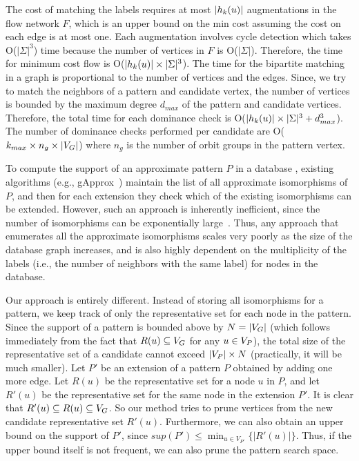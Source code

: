 \medskip{} The cost of matching the
\khop labels requires at most $|h_{k}(u)|$ augmentations in the flow
network $F$, which is an upper bound on the min cost assuming the cost on
each edge is at most one. Each augmentation involves cycle detection
which takes O($|\Sigma|^3$) time because the number of vertices in $F$ is
O($|\Sigma|$).  Therefore, the time for minimum cost flow is 
O($|h_{k}(u) | \times |\Sigma|^3 $).
The time for the bipartite matching in a graph is
proportional to the number of vertices and the edges.  Since, we
try to match the neighbors of a pattern and candidate vertex,  the number
of vertices is bounded by the maximum degree $d_{max}$ of the pattern
and candidate vertices. Therefore, the total time for each dominance
check is O($|h_{k}(u)| \times |\Sigma|^3 + d_{max}^{3}$).  The
number of dominance checks performed per candidate are O($k_{max}
\times n_g \times |V_G|$) where $n_g$ is the number of orbit groups in
the pattern vertex. 

To compute the support of an approximate pattern $P$ in a database \db,
existing algorithms (e.g., gApprox~\cite{gapprox}) maintain the list of
all approximate isomorphisms of $P$, and then for each extension they
check which of the existing isomorphisms can be extended. However, such an
approach is inherently inefficient, since the number of isomorphisms can
be exponentially large~\cite{2012-kais}.  Thus, any approach that
enumerates all the approximate isomorphisms scales very poorly as the size
of the database graph increases, and is also highly dependent on the
multiplicity of the labels (i.e., the number of neighbors with the same
label) for nodes in the database.

Our approach is entirely different. Instead of storing all isomorphisms
for a pattern, we keep track of only the representative set for each
node in the pattern.  Since the support of a pattern is bounded above by
$N=|V_G|$ (which follows immediately from the fact that $R(u) \subseteq
V_G$ for any $u \in V_P$), the total size of the representative set of a
candidate cannot exceed $|V_P| \times N$ (practically, it will be much
smaller).  Let $P'$ be an extension of a pattern $P$ obtained by adding
one more edge. Let $R(u)$ be the representative set for a node $u$ in
$P$, and let $R'(u)$ be the representative set for the same node in the
extension $P'$. It is clear that $R'(u) \subseteq R(u) \subseteq V_G$.
So our method tries to prune vertices from the new candidate
representative set $R'(u)$. 
Furthermore, we can also obtain an upper
bound on the support of $P'$, since $sup(P') \le \min_{u \in V_{P'}}
\{|R'(u)|\}$. Thus, if the upper bound itself is not frequent, we can
also prune the pattern search space.
\fi
